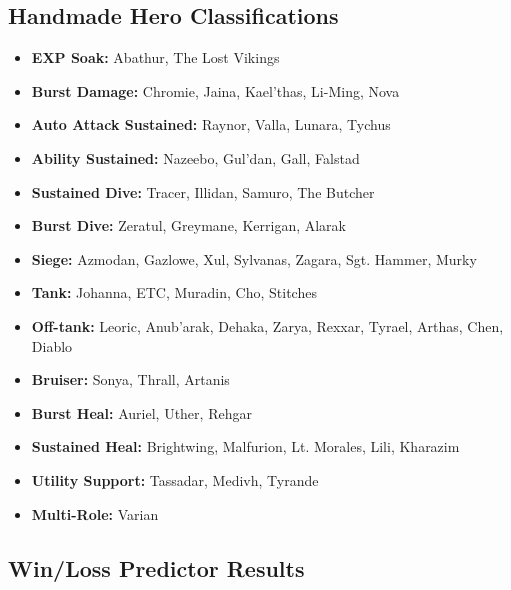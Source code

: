 \documentclass[11pt,letterpaper]{article}
\begin{document}
\subsection*{Handmade Hero Classifications}
\begin{itemize}
\item \textbf{EXP Soak:}  Abathur, The Lost Vikings
\item \textbf{Burst Damage:} Chromie, Jaina, Kael'thas, Li-Ming, Nova
\item \textbf{Auto Attack Sustained:}  Raynor, Valla, Lunara, Tychus
\item \textbf{Ability Sustained:} Nazeebo, Gul'dan, Gall, Falstad
\item \textbf{Sustained Dive:}  Tracer, Illidan, Samuro, The Butcher
\item \textbf{Burst Dive:} Zeratul, Greymane, Kerrigan, Alarak
\item \textbf{Siege:} Azmodan, Gazlowe, Xul, Sylvanas, Zagara, Sgt. Hammer, Murky
\item \textbf{Tank:} Johanna, ETC, Muradin, Cho, Stitches
\item \textbf{Off-tank:} Leoric, Anub'arak, Dehaka, Zarya, Rexxar, Tyrael, Arthas, Chen, Diablo
\item \textbf{Bruiser:} Sonya, Thrall, Artanis
\item \textbf{Burst Heal:} Auriel, Uther, Rehgar
\item \textbf{Sustained Heal:} Brightwing, Malfurion, Lt. Morales, Lili, Kharazim
\item \textbf{Utility Support:}  Tassadar, Medivh, Tyrande
\item \textbf{Multi-Role:} Varian
\end{itemize}


\subsection*{Win/Loss Predictor Results}
\end{document}
